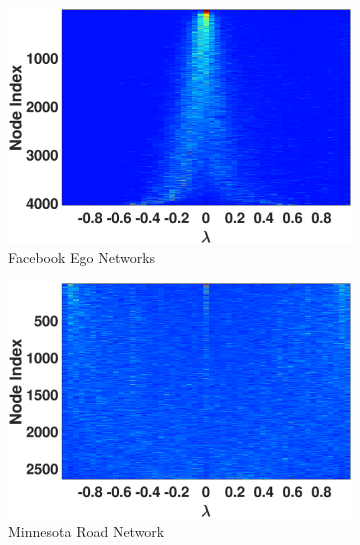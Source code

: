 \begin{figure}[htp]
\begin{subfigure}[t]{0.19\textwidth}
    \includegraphics[width=\textwidth,trim = .4cm 0.5cm 3.5cm 1.3cm,clip]
    {./ndos/pics/facebook_ldos}
    \caption{Facebook Ego Networks}
    \label{fig:facebook_ldos}
  \end{subfigure}
  \begin{subfigure}[t]{0.19\textwidth}
    \centering  
    \captionsetup{justification=centering,font=scriptsize}
    \includegraphics[width=\textwidth,trim = .4cm 0.5cm 3.5cm 1.3cm,clip]
    {./ndos/pics/minnesota_ldos}
    \caption{Minnesota Road Network}
    \label{fig:minnesota_ldos}
  \end{subfigure}
  \begin{subfigure}[t]{0.19\textwidth}
    \centering  
    \captionsetup{justification=centering,font=scriptsize}

\end{subfigure}
\end{figure}
